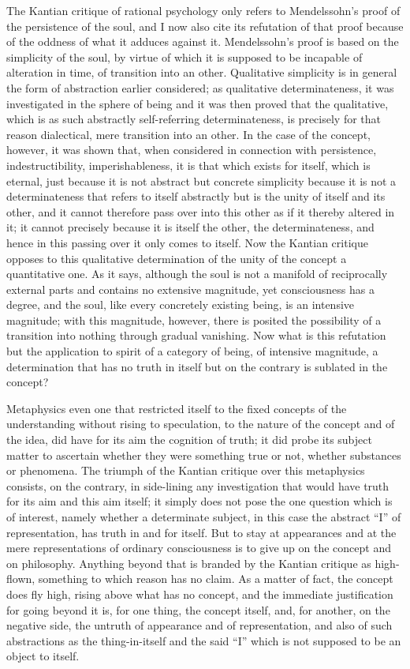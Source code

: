 The Kantian critique of rational psychology
only refers to Mendelssohn's proof of the persistence of the soul,
and I now also cite its refutation of that proof
because of the oddness of what it adduces against it.
Mendelssohn's proof is based on the simplicity of the soul,
by virtue of which it is supposed to be incapable
of alteration in time, of transition into an other.
Qualitative simplicity is in general the
form of abstraction earlier considered;
as qualitative determinateness, it was investigated
in the sphere of being
and it was then proved that the qualitative,
which is as such abstractly self-referring determinateness,
is precisely for that reason dialectical,
mere transition into an other.
In the case of the concept, however, it was shown that,
when considered in connection with persistence,
indestructibility, imperishableness,
it is that which exists for itself,
which is eternal, just because it is
not abstract but concrete simplicity
because it is not a determinateness
that refers to itself abstractly
but is the unity of itself and its other,
and it cannot therefore pass over into this other
as if it thereby altered in it;
it cannot precisely because it is itself the other,
the determinateness, and hence in this
passing over it only comes to itself.
Now the Kantian critique opposes to this
qualitative determination of the unity of the concept
a quantitative one.
As it says, although the soul is not
a manifold of reciprocally external parts
and contains no extensive magnitude,
yet consciousness has a degree,
and the soul, like every concretely existing being,
is an intensive magnitude;
with this magnitude, however, there is posited
the possibility of a transition into nothing through gradual vanishing.
Now what is this refutation but the application to spirit
of a category of being, of intensive magnitude,
a determination that has no truth in itself
but on the contrary is sublated in the concept?

Metaphysics even one that restricted itself
to the fixed concepts of the understanding
without rising to speculation,
to the nature of the concept and of the idea,
did have for its aim the cognition of truth;
it did probe its subject matter to ascertain
whether they were something true or not,
whether substances or phenomena.
The triumph of the Kantian critique
over this metaphysics consists, on the contrary,
in side-lining any investigation
that would have truth for its aim and this aim itself;
it simply does not pose the one question
which is of interest,
namely whether a determinate subject,
in this case the abstract “I” of representation,
has truth in and for itself.
But to stay at appearances
and at the mere representations
of ordinary consciousness is to give up
on the concept and on philosophy.
Anything beyond that is branded
by the Kantian critique as high-flown,
something to which reason has no claim.
As a matter of fact, the concept does fly high,
rising above what has no concept,
and the immediate justification
for going beyond it is, for one thing, the concept itself,
and, for another, on the negative side,
the untruth of appearance and of representation,
and also of such abstractions as the thing-in-itself
and the said “I” which is not supposed to be an object to itself.

